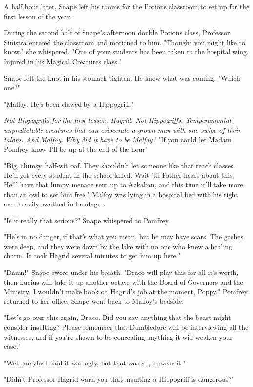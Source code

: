 A half hour later, Snape left his rooms for the Potions classroom to set up for the first lesson of the year.

During the second half of Snape's afternoon double Potions class, Professor Sinistra entered the classroom and motioned to him. "Thought you might like to know," she whispered. "One of your students has been taken to the hospital wing. Injured in his Magical Creatures class."

Snape felt the knot in his stomach tighten. He knew what was coming. "Which one?"

"Malfoy. He's been clawed by a Hippogriff."

\emph{Not Hippogriffs for the first lesson, Hagrid. Not Hippogriffs. Temperamental, unpredictable creatures that can eviscerate a grown man with one swipe of their talons. And Malfoy. Why did it have to be Malfoy?} "If you could let Madam Pomfrey know I'll be up at the end of the hour{\el}"

\sbreak

"Big, clumsy, half-wit oaf. They shouldn't let someone like that teach classes. He'll get every student in the school killed. Wait 'til Father hears about this. He'll have that lumpy menace sent up to Azkaban, and this time it'll take more than an owl to set him free." Malfoy was lying in a hospital bed with his right arm heavily swathed in bandages.

"Is it really that serious?" Snape whispered to Pomfrey.

"He's in no danger, if that's what you mean, but he may have scars. The gashes were deep, and they were down by the lake with no one who knew a healing charm. It took Hagrid several minutes to get him up here."

"Damn!" Snape swore under his breath. "Draco will play this for all it's worth, then Lucius will take it up another octave with the Board of Governors and the Ministry. I wouldn't make book on Hagrid's job at the moment, Poppy." Pomfrey returned to her office. Snape went back to Malfoy's bedside.

"Let's go over this again, Draco. Did you say anything that the beast might consider insulting? Please remember that Dumbledore will be interviewing all the witnesses, and if you're shown to be concealing anything it will weaken your case."

"Well, maybe I said it was ugly, but that was all, I swear it."

"Didn't Professor Hagrid warn you that insulting a Hippogriff is dangerous?"

